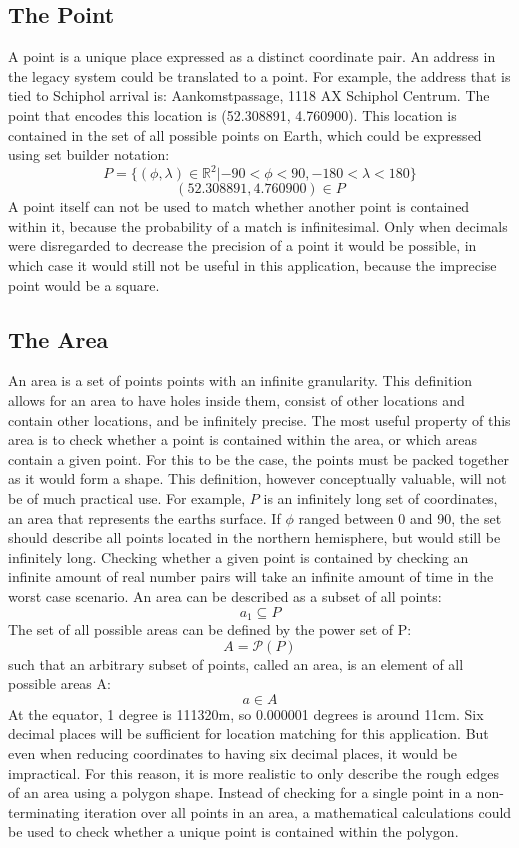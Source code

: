\subsection{The Point}
A point is a unique place expressed as a distinct coordinate pair. An address in the legacy system could be translated to a point. For example, the address that is tied to Schiphol arrival is: Aankomstpassage, 1118 AX Schiphol Centrum.
The point that encodes this location is (52.308891, 4.760900). This location is contained in the set of all possible points on Earth, which could be expressed using set builder notation:
\[P = \{(\phi,\lambda) \in \mathbb{R}^2 | -90 < \phi < 90, -180 < \lambda < 180 \}\]
\[(52.308891, 4.760900) \in P\]
A point itself can not be used to match whether another point is contained within it, because the probability of a match is infinitesimal. Only when decimals were disregarded to decrease the precision of a point it would be possible, in which case it would still not be useful in this application, because the imprecise point would be a square.

\subsection{The Area}
An area is a set of points points with an infinite granularity. This definition allows for an area to have holes inside them, consist of other locations and contain other locations, and be infinitely precise. The most useful property of this area is to check whether a point is contained within the area, or which areas contain a given point. For this to be the case, the points must be packed together as it would form a shape. This definition, however conceptually valuable, will not be of much practical use. For example, $P$ is an infinitely long set of coordinates, an area that represents the earths surface. If $\phi$ ranged between 0 and 90, the set should describe all points located in the northern hemisphere, but would still be infinitely long. Checking whether a given point is contained by checking an infinite amount of real number pairs will take an infinite amount of time in the worst case scenario. An area can be described as a subset of all points:
\[a_1 \subseteq P \]
The set of all possible areas can be defined by the power set of P:
\[A = \mathcal{P}(P)\]
such that an arbitrary subset of points, called an area, is an element of all possible areas A:
\[a \in A\]
At the equator, 1 degree is 111320m, so 0.000001 degrees is
around 11cm. Six decimal places will be sufficient for location matching for this application. But even when reducing coordinates to having six decimal places, it would be impractical. For this reason, it is more realistic to only describe the rough edges of an area using a polygon shape. Instead of checking for a single point in a non-terminating iteration over all points in an area, a mathematical calculations could be used to check whether a unique point is contained within the polygon.

